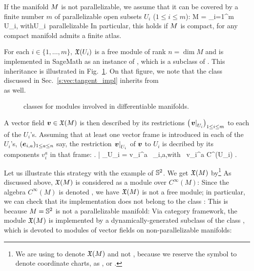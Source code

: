If the manifold $M$ is not parallelizable,
we assume that it can be covered by a finite number $m$
of parallelizable open subsets $U_i$ ($1\leq i \leq m$):
\be
    M = \bigcup_{i=1}^m U_i, \qquad\mbox{with}\quad U_i\ \mbox{parallelizable}
\ee
In particular, this holds if $M$ is compact, for any compact
manifold admits a finite atlas.

For each $i\in\{1,\ldots,m\}$, $\mathfrak{X}(U_i)$ is a free module of rank $n=\dim  M$ and is implemented in SageMath as an instance of
, which is a subclass of
. This inheritance is illustrated in
Fig.~\ref{f:vec:module_classes}. On that figure, we note that the class
 discussed in Sec.~\ref{s:vec:tangent_impl} inherits from\\
 as well.

\begin{figure}
\begin{center}

\end{center}
\caption{\label{f:vec:module_classes} \footnotesize
\Sage{} classes for modules involved in differentiable manifolds.}
\end{figure}


A vector field $\bm{v}\in\mathfrak{X}(M)$ is then described by its
restrictions $\left(\left. \bm{v}\right| _{U_i}\right)_{1\leq i \leq m}$ to each of the $U_i$'s.
Assuming that at least one vector frame is introduced in each of the $U_i$'s,
$(\bm{e}_{i,a})_{1\leq a \leq n}$ say, the restriction $\left. \bm{v}\right| _{U_i}$ of
$\bm{v}$ to $U_i$ is decribed by its components $v_i^a$ in that frame:
\be \label{e:vec:vi_expand}
    \left. \right| _{U_i} = v_i^a \, _{i,a},\quad\mbox{with\ } v_i^a \in C^\infty(U_i) .
\ee

Let us illustrate this strategy with the example of $\mathbb{S}^2$.
We get $\mathfrak{X}(M)$ by\footnote{We are using  to denote $\mathfrak{X}(M)$ and not , because we reserve the symbol  to denote coordinate charts, as
,  or .}
As discussed above, $\mathfrak{X}(M)$ is considered as a module over $C^\infty(M)$:
Since the algebra $C^\infty(M)$ is denoted , we have
$\mathfrak{X}(M)$ is not a free module; in particular, we can check that its \Sage{} implementation does not
belong to the class :
This is because $M=\mathbb{S}^2$ is not a parallelizable manifold:
Via \Sage{} category framework,
the module $\mathfrak{X}(M)$ is implemented by a dynamically-generated subclass
of the class , which is devoted to modules of vector fields
on non-parallelizable manifolds:


